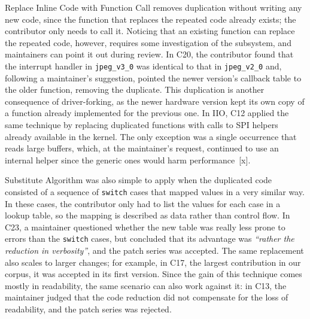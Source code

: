 \documentclass[10pt,conference]{IEEEtran}
\begin{document}
Replace Inline Code with Function Call removes duplication without writing any new code, since the function that replaces the repeated code already exists; the contributor only needs to call it. Noticing that an existing function can replace the repeated code, however, requires some investigation of the subsystem, and maintainers can point it out during review. In C20, the contributor found that the interrupt handler in \texttt{jpeg\_v3\_0} was identical to that in \texttt{jpeg\_v2\_0} and, following a maintainer's suggestion, pointed the newer version's callback table to the older function, removing the duplicate. This duplication is another consequence of driver-forking, as the newer hardware version kept its own copy of a function already implemented for the previous one. In IIO, C12 applied the same technique by replacing duplicated functions with calls to SPI helpers already available in the kernel. The only exception was a single occurrence that reads large buffers, which, at the maintainer's request, continued to use an internal helper since the generic ones would harm performance~[x].

Substitute Algorithm was also simple to apply when the duplicated code consisted of a sequence of \texttt{switch} cases that mapped values in a very similar way. In these cases, the contributor only had to list the values for each case in a lookup table, so the mapping is described as data rather than control flow. In C23, a maintainer questioned whether the new table was really less prone to errors than the \texttt{switch} cases, but concluded that its advantage was \textit{``rather the reduction in verbosity''}, and the patch series was accepted. The same replacement also scales to larger changes; for example, in C17, the largest contribution in our corpus, it was accepted in its first version. Since the gain of this technique comes mostly in readability, the same scenario can also work against it: in C13, the maintainer judged that the code reduction did not compensate for the loss of readability, and the patch series was rejected.
\end{document}

